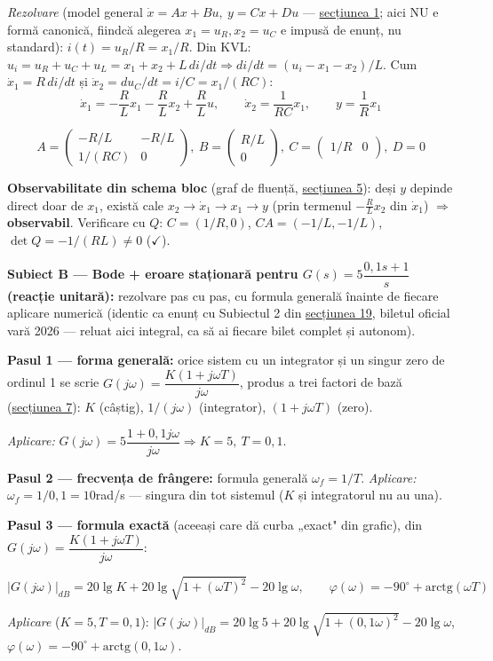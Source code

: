 \documentclass[10pt,a4paper]{article}
\begin{document}
\textit{Rezolvare} (model general $\dot x=Ax+Bu,\ y=Cx+Du$ — \hyperref[sec:1]{secțiunea 1}; aici NU e formă canonică, fiindcă alegerea $x_1{=}u_R,x_2{=}u_C$ e impusă de enunț, nu standard): $i(t)=u_R/R=x_1/R$. Din KVL: $u_i=u_R+u_C+u_L=x_1+x_2+L\,di/dt\Rightarrow di/dt=(u_i-x_1-x_2)/L$. Cum $\dot x_1=R\,di/dt$ și $\dot x_2=du_C/dt=i/C=x_1/(RC)$:
$$\dot x_1=-\dfrac{R}{L}x_1-\dfrac{R}{L}x_2+\dfrac{R}{L}u,\qquad \dot x_2=\dfrac{1}{RC}x_1,\qquad y=\dfrac{1}{R}x_1$$
\begin{keyeq}\color{red!65!black}
$$A=\begin{pmatrix}-R/L&-R/L\\1/(RC)&0\end{pmatrix},\ B=\begin{pmatrix}R/L\\0\end{pmatrix},\ C=\begin{pmatrix}1/R&0\end{pmatrix},\ D=0$$
\end{keyeq}
\textbf{Observabilitate din schema bloc} (graf de fluență, \hyperref[sec:5]{secțiunea 5}): deși $y$ depinde direct doar de $x_1$, există cale $x_2\to\dot x_1\to x_1\to y$ (prin termenul $-\tfrac{R}{L}x_2$ din $\dot x_1$) $\Rightarrow$ \textbf{observabil}. Verificare cu $Q$: $C=(1/R,0)$, $CA=(-1/L,-1/L)$, $\det Q=-1/(RL)\ne0$ ($\checkmark$).

\textbf{Subiect B — Bode + eroare staționară pentru $G(s)=5\dfrac{0{,}1s+1}{s}$ (reacție unitară):} rezolvare pas cu pas, cu formula generală înainte de fiecare aplicare numerică (identic ca enunț cu Subiectul 2 din \hyperref[sec:19]{secțiunea 19}, biletul oficial vară 2026 — reluat aici integral, ca să ai fiecare bilet complet și autonom).

\textbf{Pasul 1 — forma generală:} orice sistem cu un integrator și un singur zero de ordinul 1 se scrie $G(j\omega)=\dfrac{K(1+j\omega T)}{j\omega}$, produs a trei factori de bază (\hyperref[sec:7]{secțiunea 7}): $K$ (câștig), $1/(j\omega)$ (integrator), $(1+j\omega T)$ (zero).

\textit{Aplicare:} $G(j\omega)=5\dfrac{1+0{,}1j\omega}{j\omega}\Rightarrow K{=}5,\ T{=}0{,}1$.

\textbf{Pasul 2 — frecvența de frângere:} formula generală $\omega_f=1/T$. \textit{Aplicare:} $\omega_f=1/0{,}1=10$rad/s — singura din tot sistemul ($K$ și integratorul nu au una).

\textbf{Pasul 3 — formula exactă} (aceeași care dă curba „exact" din grafic), din $G(j\omega)=\dfrac{K(1+j\omega T)}{j\omega}$:
\begin{keyeq}\color{red!65!black}
$$|G(j\omega)|_{dB}=20\lg K+20\lg\sqrt{1+(\omega T)^2}-20\lg\omega,\qquad \varphi(\omega)=-90^\circ+\mathrm{arctg}(\omega T)$$
\end{keyeq}
\textit{Aplicare} ($K{=}5,T{=}0{,}1$): $|G(j\omega)|_{dB}=20\lg5+20\lg\sqrt{1+(0{,}1\omega)^2}-20\lg\omega$,\quad $\varphi(\omega)=-90^\circ+\mathrm{arctg}(0{,}1\omega)$.
\end{document}
